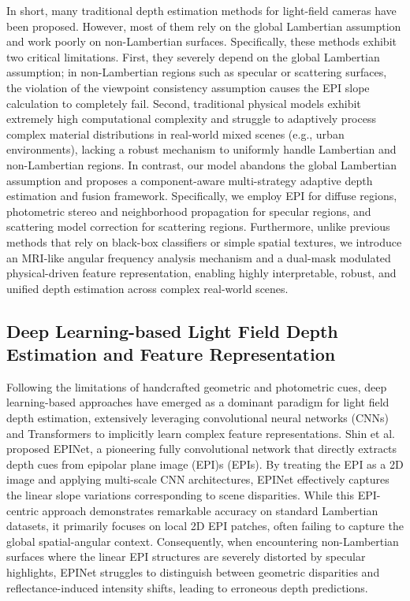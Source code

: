 \documentclass[lettersize,journal]{IEEEtran}
\begin{document}
In short, many traditional depth estimation methods for light-field cameras have been proposed. However, most of them rely on the global Lambertian assumption and work poorly on non-Lambertian surfaces. Specifically, these methods exhibit two critical limitations. First, they severely depend on the global Lambertian assumption; in non-Lambertian regions such as specular or scattering surfaces, the violation of the viewpoint consistency assumption causes the EPI slope calculation to completely fail. Second, traditional physical models exhibit extremely high computational complexity and struggle to adaptively process complex material distributions in real-world mixed scenes (e.g., urban environments), lacking a robust mechanism to uniformly handle Lambertian and non-Lambertian regions. In contrast, our model abandons the global Lambertian assumption and proposes a component-aware multi-strategy adaptive depth estimation and fusion framework. Specifically, we employ EPI for diffuse regions, photometric stereo and neighborhood propagation for specular regions, and scattering model correction for scattering regions. Furthermore, unlike previous methods that rely on black-box classifiers or simple spatial textures, we introduce an MRI-like angular frequency analysis mechanism and a dual-mask modulated physical-driven feature representation, enabling highly interpretable, robust, and unified depth estimation across complex real-world scenes.

\subsection{Deep Learning-based Light Field Depth Estimation and Feature Representation}

Following the limitations of handcrafted geometric and photometric cues, deep learning-based approaches have emerged as a dominant paradigm for light field depth estimation, extensively leveraging convolutional neural networks (CNNs) and Transformers to implicitly learn complex feature representations. Shin et al.  proposed EPINet, a pioneering fully convolutional network that directly extracts depth cues from epipolar plane image (EPI)s (EPIs). By treating the EPI as a 2D image and applying multi-scale CNN architectures, EPINet effectively captures the linear slope variations corresponding to scene disparities. While this EPI-centric approach demonstrates remarkable accuracy on standard Lambertian datasets, it primarily focuses on local 2D EPI patches, often failing to capture the global spatial-angular context. Consequently, when encountering non-Lambertian surfaces where the linear EPI structures are severely distorted by specular highlights, EPINet struggles to distinguish between geometric disparities and reflectance-induced intensity shifts, leading to erroneous depth predictions.
\end{document}
